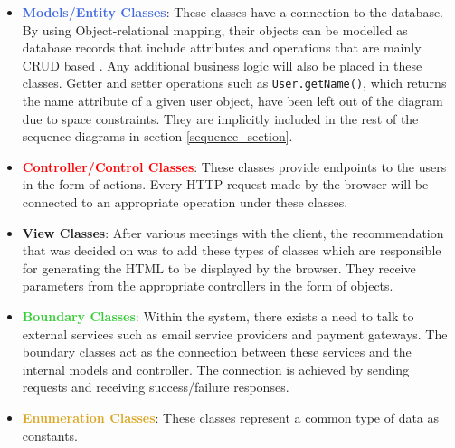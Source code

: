 \begin{itemize}
    \item \textcolor{RoyalBlue}{\textbf{Models/Entity Classes}}: These classes have a connection to the database. By using Object-relational mapping, their objects can be modelled as database records that include attributes and operations that are mainly CRUD based \cite{Hibernate}. Any additional business logic will also be placed in these classes.
    Getter and setter operations such as \texttt{User.getName()}, which returns the name attribute of a given user object, have been left out of the diagram due to space constraints. They are implicitly included in the rest of the sequence diagrams in section \ref{sequence_section}.

    \item \textcolor{red}{\textbf{Controller/Control Classes}}: These classes provide endpoints to the users in the form of actions. Every HTTP request made by the browser will be connected to an appropriate operation under these classes.
    \item \textcolor{RedViolet}{\textbf{View Classes}}: After various meetings with the client, the recommendation that was decided on was to add these types of classes which are responsible for generating the HTML to be displayed by the browser. They receive parameters from the appropriate controllers in the form of objects.
    \item \textcolor{LimeGreen}{\textbf{Boundary Classes}}: Within the system, there exists a need to talk to external services such as email service providers and payment gateways. The boundary classes act as the connection between these services and the internal models and controller. The connection is achieved by sending requests and receiving success/failure responses.
    \item \textcolor{Goldenrod}{\textbf{Enumeration Classes}}: These classes represent a common type of data as constants.
\end{itemize}

